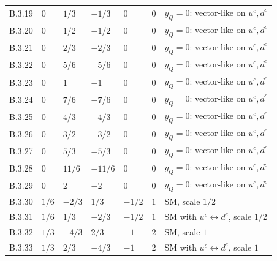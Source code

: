 {\begin{longtable}{@{}llllll>{\raggedright\arraybackslash}p{6.5cm}@{}}
B.3.19 & $0$ & $1/3$ & $-1/3$ & $0$ & $0$ & $y_Q=0$: vector-like on $u^c,d^c$ \\
B.3.20 & $0$ & $1/2$ & $-1/2$ & $0$ & $0$ & $y_Q=0$: vector-like on $u^c,d^c$ \\
B.3.21 & $0$ & $2/3$ & $-2/3$ & $0$ & $0$ & $y_Q=0$: vector-like on $u^c,d^c$ \\
B.3.22 & $0$ & $5/6$ & $-5/6$ & $0$ & $0$ & $y_Q=0$: vector-like on $u^c,d^c$ \\
B.3.23 & $0$ & $1$ & $-1$ & $0$ & $0$ & $y_Q=0$: vector-like on $u^c,d^c$ \\
B.3.24 & $0$ & $7/6$ & $-7/6$ & $0$ & $0$ & $y_Q=0$: vector-like on $u^c,d^c$ \\
B.3.25 & $0$ & $4/3$ & $-4/3$ & $0$ & $0$ & $y_Q=0$: vector-like on $u^c,d^c$ \\
B.3.26 & $0$ & $3/2$ & $-3/2$ & $0$ & $0$ & $y_Q=0$: vector-like on $u^c,d^c$ \\
B.3.27 & $0$ & $5/3$ & $-5/3$ & $0$ & $0$ & $y_Q=0$: vector-like on $u^c,d^c$ \\
B.3.28 & $0$ & $11/6$ & $-11/6$ & $0$ & $0$ & $y_Q=0$: vector-like on $u^c,d^c$ \\
B.3.29 & $0$ & $2$ & $-2$ & $0$ & $0$ & $y_Q=0$: vector-like on $u^c,d^c$ \\
B.3.30 & $1/6$ & $-2/3$ & $1/3$ & $-1/2$ & $1$ & SM, scale $1/2$ \\
B.3.31 & $1/6$ & $1/3$ & $-2/3$ & $-1/2$ & $1$ & SM with $u^c\leftrightarrow d^c$, scale $1/2$ \\
B.3.32 & $1/3$ & $-4/3$ & $2/3$ & $-1$ & $2$ & SM, scale $1$ \\
B.3.33 & $1/3$ & $2/3$ & $-4/3$ & $-1$ & $2$ & SM with $u^c\leftrightarrow d^c$, scale $1$ \\
\end{longtable}}
